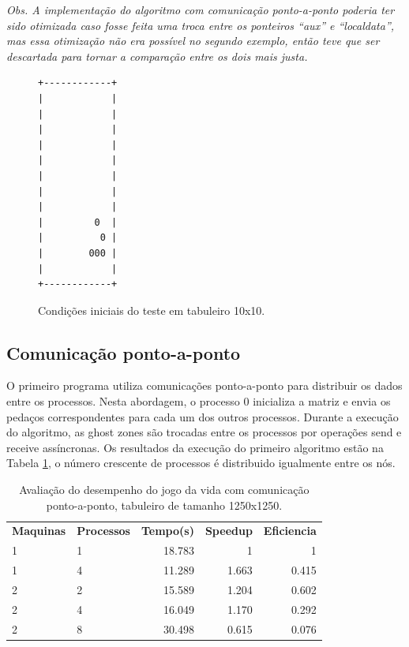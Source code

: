 \documentclass[conference]{IEEEtran}
\begin{document}
\textit{ Obs. A implementação do algoritmo com comunicação ponto-a-ponto poderia ter sido otimizada caso fosse feita uma troca entre os ponteiros ``aux'' e ``localdata'', mas essa otimização não era possível no segundo exemplo, então teve que ser descartada para tornar a comparação entre os dois mais justa. }


\begin{figure}[!htb]
\begin{verbatim}
+------------+
|            |
|            |
|            |
|            |
|            |
|            |
|            |
|            |
|         0  |
|          0 |
|        000 |
|            |
+------------+
\end{verbatim}
\caption{Condições iniciais do teste em tabuleiro 10x10.}
\label{fig:ex02}
\end{figure}

\subsection{Comunicação ponto-a-ponto \label{sec:ex02a}}
O primeiro programa utiliza comunicações ponto-a-ponto para distribuir os dados entre os processos. Nesta abordagem, o processo 0 inicializa a matriz e envia os pedaços correspondentes para cada um dos outros processos. Durante a execução do algoritmo, as ghost zones são trocadas entre os processos por operações send e receive assíncronas. Os resultados da execução do primeiro algoritmo estão na Tabela \ref{tab:ex02a}, o número crescente de processos é distribuido igualmente entre os nós.

\begin{table}[htb!]
  \centering
	\begin{adjustbox}{max width=\linewidth}
	\begin{tabular}{llrrr}%
		\bfseries Maquinas & \bfseries Processos & \bfseries Tempo(s) & \bfseries Speedup & \bfseries Eficiencia  \\
    1 &	1	& 18.783	& 1	    & 1     \\
    1 &	4	& 11.289	& 1.663 & 0.415 \\
    2 &	2	& 15.589	& 1.204 & 0.602 \\
    2 &	4	& 16.049	& 1.170 & 0.292 \\
    2 &	8	& 30.498	& 0.615 &	0.076 \\

	\end{tabular}
	\end{adjustbox}
	\caption{\label{tab:ex02a}Avaliação do desempenho do jogo da vida com comunicação ponto-a-ponto, tabuleiro de tamanho 1250x1250.}
\end{table}
\end{document}
